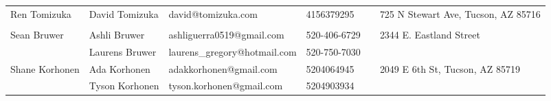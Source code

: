 \documentclass[landscape]{article}\usepackage[]{graphicx}\usepackage[]{color}
\begin{document}
\begin{longtable}{|p{100pt}|p{100pt}|p{140pt}|p{60pt}|p{64pt}|p{120pt}|}
 &  &  &  &  & \\
\hline
\multirow{2}{100pt}{Ren Tomizuka} & David Tomizuka & david@tomizuka.com & 4156379295 &  & \multirow{2}{120pt}{725 N Stewart Ave, Tucson, AZ 85716} \\
 &  &  &  &  & \\
\hline
\multirow{2}{100pt}{Sean Bruwer} & Ashli Bruwer & ashliguerra0519@gmail.com & 520-406-6729 &  & \multirow{2}{120pt}{2344 E. Eastland Street} \\
 & Laurens Bruwer & laurens\_gregory@hotmail.com & 520-750-7030 &  & \\
\hline
\multirow{2}{100pt}{Shane Korhonen} & Ada Korhonen & adakkorhonen@gmail.com & 5204064945 &  & \multirow{2}{120pt}{2049 E 6th St, Tucson, AZ 85719} \\
 & Tyson Korhonen & tyson.korhonen@gmail.com & 5204903934 &  & \\
\hline
\end{longtable}
\newpage
\end{document}
